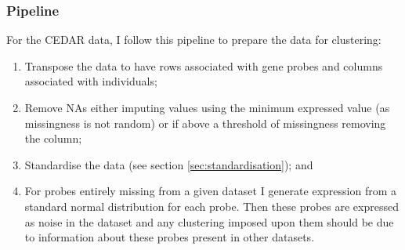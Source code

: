 \documentclass[12pt]{article} %
\begin{document}
	 	\subsubsection{Pipeline}
	For the CEDAR data, I follow this pipeline to prepare the data for clustering:
	\begin{enumerate} \label{list:methods}
		\item Transpose the data to have rows associated with gene probes and columns associated with individuals;
		\item Remove NAs either imputing values using the minimum expressed value (as missingness is not random) or if above a threshold of missingness removing the column;
		\item Standardise the data (see section \ref{sec:standardisation}); and
		\item For probes entirely missing from a given dataset I generate expression from a standard normal distribution for each probe. Then these probes are expressed as noise in the dataset and any clustering imposed upon them should be due to information about these probes present in other datasets. %
	\end{enumerate}
\end{document}
